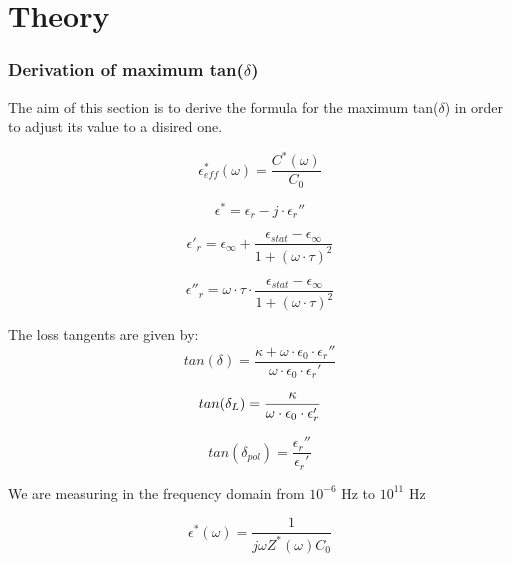 \chapter{Theory}

\subsection{Derivation of maximum tan($\delta$)}
The aim of this section is to derive the formula for the maximum tan($\delta$) in order to adjust its value to a disired one.


\begin{equation}
\epsilon_{eff}^* (\omega) = \frac{C^*(\omega)}{C_0}
\end{equation}

\begin{equation}
\epsilon^* = \epsilon_r-j \cdot \epsilon_r''
\end{equation}


\begin{equation}
\epsilon'_r = \epsilon_{\infty} + \frac{\epsilon_{stat}-\epsilon_{\infty}}{1+(\omega \cdot \tau )^2}
\end{equation}

\begin{equation}
\epsilon''_r = \omega \cdot \tau \cdot \frac{\epsilon_{stat}-\epsilon_{\infty}}{1+(\omega \cdot \tau )^2}
\end{equation}


The loss tangents are given by:
\begin{equation}
tan (\delta) = \frac{\kappa + \omega \cdot \epsilon_0 \cdot \epsilon _r ''}{\omega \cdot \epsilon_0 \cdot \epsilon _r '}
\end{equation}

\begin{equation}
tan (\delta_{L}) = \frac{\kappa}{\omega \cdot \epsilon_0 \cdot \epsilon_r'} \newline
\end{equation}

\begin{equation}
tan (\delta_{pol}) = \frac {\epsilon_r'' } {\epsilon_r'}
\end{equation}


We are measuring in the frequency domain from $10^{-6}$ Hz to $10^{11}$ Hz 

\begin{equation}
\epsilon^*(\omega) = \frac{1}{j \omega  Z^*(\omega) C_0}
\end{equation}

